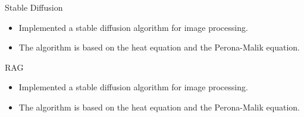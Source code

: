

\begin{cventries}


  \cventrynotitle
    {
      \begin{cvitems} %
        \item {Stable Diffusion}
        \begin{itemize}
            \item {Implemented a stable diffusion algorithm for image processing.}
            \item {The algorithm is based on the heat equation and the Perona-Malik equation.}
        \end{itemize}
        \item {RAG}
        \begin{itemize}
            \item {Implemented a stable diffusion algorithm for image processing.}
            \item {The algorithm is based on the heat equation and the Perona-Malik equation.}
        \end{itemize}
      \end{cvitems}
    }


\end{cventries}
